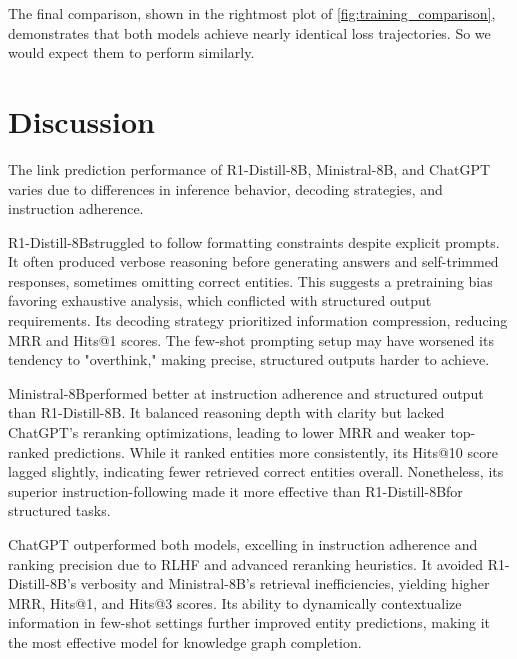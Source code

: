 \documentclass[12pt,a4paper]{article}
\newcommand{\modelministral}{Ministral-8B}
\newcommand{\modeldeepseek}{R1-Distill-8B}
\begin{document}
The final comparison, shown in the rightmost plot of \cref{fig:training_comparison}, demonstrates that both models achieve nearly identical loss trajectories.
So we would expect them to perform similarly.




%
%

\section{Discussion}\label{sec:discussion}


The link prediction performance of \modeldeepseek, \modelministral, and ChatGPT varies due to differences in inference behavior, decoding strategies, and instruction adherence.

\modeldeepseek struggled to follow formatting constraints despite explicit prompts. It often produced verbose reasoning before generating answers and self-trimmed responses, sometimes omitting correct entities. This suggests a pretraining bias favoring exhaustive analysis, which conflicted with structured output requirements. Its decoding strategy prioritized information compression, reducing MRR and Hits@1 scores. The few-shot prompting setup may have worsened its tendency to "overthink," making precise, structured outputs harder to achieve.

\modelministral performed better at instruction adherence and structured output than \modeldeepseek. It balanced reasoning depth with clarity but lacked ChatGPT's reranking optimizations, leading to lower MRR and weaker top-ranked predictions. While it ranked entities more consistently, its Hits@10 score lagged slightly, indicating fewer retrieved correct entities overall. Nonetheless, its superior instruction-following made it more effective than \modeldeepseek for structured tasks.

ChatGPT outperformed both models, excelling in instruction adherence and ranking precision due to RLHF and advanced reranking heuristics. It avoided \modeldeepseek's verbosity and \modelministral's retrieval inefficiencies, yielding higher MRR, Hits@1, and Hits@3 scores. Its ability to dynamically contextualize information in few-shot settings further improved entity predictions, making it the most effective model for knowledge graph completion.
\end{document}
